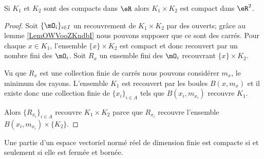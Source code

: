 \begin{lemma}\label{LemCKBooXkwkte}
    Si \( K_1\) et \( K_2\) sont des compacts dans \( \eR\) alors \( K_1\times K_2\) est compact dans \( \eR^2\).
\end{lemma}

\begin{proof}
    Soit \( \{ \mO_i \}_{i\in I}\) un recouvrement de \( K_1\times K_2\) par des ouverts; grâce au lemme \ref{LemOWVooZKndbI} nous pouvons supposer que ce sont des carrés. Pour chaque \( x\in K_1\), l'ensemble \( \{ x \}\times K_2\) est compact et donc recouvert par un nombre fini des \( \mO_i\). Soit \( R_x\) un ensemble fini des \( \mO_i\) recouvrant \( \{ x \}\times K_2\).

    Vu que \( R_x\) est une collection finie de carrés nous pouvons considérer \( m_x\), le minimum des rayons. L'ensemble \( K_1\) est recouvert par les boules \( B(x,m_x)\) et il existe donc une collection finie de \( \{ x_i \}_{i\in A}\) tels que \( B(x_i,m_{x_i})\) recouvre \( K_1\).

    Alors \( \{ R_{x_i} \}_{i\in A}\) recouvre \( K_1\times K_2\) parce que \( R_{x_i}\) recouvre l'ensemble \( B(x_i,m_{x_i})\times \{ K_2 \}\).
\end{proof}

\begin{theorem} \label{ThoXTEooxFmdI}
    Une partie d'un espace vectoriel normé réel de dimension finie est compacte si et seulement si elle est fermée et bornée.
\end{theorem}

